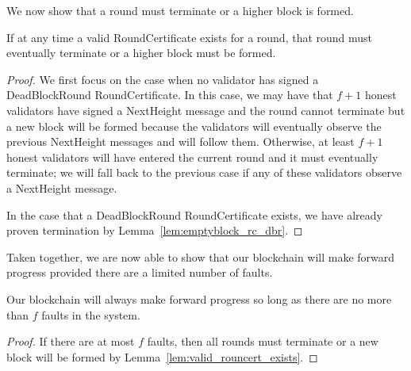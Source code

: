 We now show that a round must terminate or a higher block is formed.

\begin{lem}
\label{lem:valid_rouncert_exists}
If at any time a valid RoundCertificate exists for a round, that round must
eventually terminate or a higher block must be formed.
\end{lem}

\begin{proof}
We first focus on the case when no validator has signed a DeadBlockRound
RoundCertificate.
In this case, we may have that $f+1$ honest validators have signed a NextHeight
message and the round cannot terminate but a new block will be formed because
the validators will eventually observe the previous NextHeight messages and
will follow them.
Otherwise, at least $f+1$ honest validators will have entered the current round
and it must eventually terminate; we will fall back to the previous case if any
of these validators observe a NextHeight message.

In the case that a DeadBlockRound RoundCertificate exists, we have already
proven termination by Lemma~\ref{lem:emptyblock_rc_dbr}.
\end{proof}

Taken together, we are now able to show that our blockchain will make forward
progress provided there are a limited number of faults.

\begin{lem}
Our blockchain will always make forward progress so long as there are no more
than $f$ faults in the system.
\end{lem}

\begin{proof}
If there are at most $f$ faults, then all rounds must terminate or a new block
will be formed by Lemma~\ref{lem:valid_rouncert_exists}.
\end{proof}
